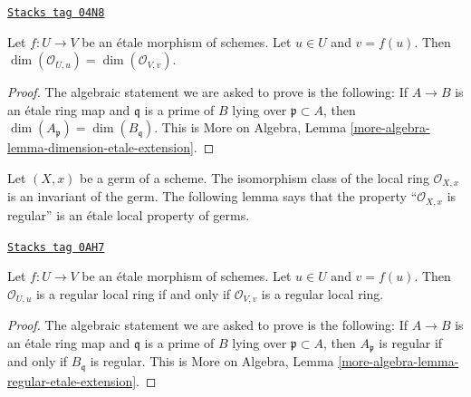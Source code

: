 \begin{lemma}
\label{descent-lemma-dimension-local-ring-local}
\href{https://stacks.math.columbia.edu/tag/04N8}{\texttt{Stacks tag 04N8}}

Let $f : U \to V$ be an \'etale morphism of schemes.
Let $u \in U$ and $v = f(u)$. Then
$\dim(\mathcal{O}_{U, u}) = \dim(\mathcal{O}_{V, v})$.
\end{lemma}

\begin{proof}
The algebraic statement we are asked to prove is the following:
If $A \to B$ is an \'etale ring map and $\mathfrak q$ is a prime of
$B$ lying over $\mathfrak p \subset A$, then
$\dim(A_{\mathfrak p}) = \dim(B_{\mathfrak q})$.
This is
More on Algebra, Lemma \ref{more-algebra-lemma-dimension-etale-extension}.
\end{proof}

Let $(X, x)$ be a germ of a scheme.
The isomorphism class of the local ring $\mathcal{O}_{X, x}$
is an invariant of the germ. The following lemma says that the
property ``$\mathcal{O}_{X, x}$ is regular'' is an \'etale local property
of germs.

\begin{lemma}
\label{descent-lemma-regular-local-ring-local}
\href{https://stacks.math.columbia.edu/tag/0AH7}{\texttt{Stacks tag 0AH7}}

Let $f : U \to V$ be an \'etale morphism of schemes.
Let $u \in U$ and $v = f(u)$. Then
$\mathcal{O}_{U, u}$ is a regular local ring if and only if
$\mathcal{O}_{V, v}$ is a regular local ring.
\end{lemma}

\begin{proof}
The algebraic statement we are asked to prove is the following:
If $A \to B$ is an \'etale ring map and $\mathfrak q$ is a prime of
$B$ lying over $\mathfrak p \subset A$, then
$A_{\mathfrak p}$ is regular if and only if $B_{\mathfrak q}$ is regular.
This is More on Algebra, Lemma
\ref{more-algebra-lemma-regular-etale-extension}.
\end{proof}

